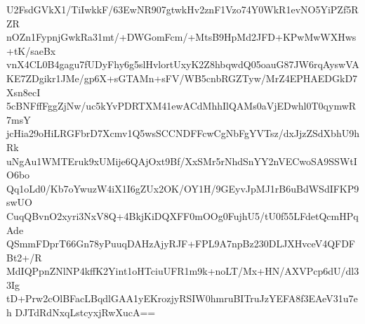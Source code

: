 U2FsdGVkX1/TiIwkkF/63EwNR907gtwkHv2znF1Vzo74Y0WkR1evNO5YiPZf5RZR
nOZn1FypnjGwkRa31mt/+DWGomFcm/+MtsB9HpMd2JFD+KPwMwWXHws+tK/saeBx
vnX4CL0B4gagu7fUDyFhy6g5slHvlortUxyK2Z8hbqwdQ05oauG87JW6rqAyswVA
KE7ZDgikr1JMe/gp6X+sGTAMn+sFV/WB5cnbRGZTyw/MrZ4EPHAEDGkD7Xsn8ecI
5cBNFffFggZjNw/uc5kYvPDRTXM41ewACdMhhIlQAMs0aVjEDwhl0T0qymwR7msY
jcHia29oHiLRGFbrD7Xcmv1Q5wsSCCNDFFcwCgNbFgYVTsz/dxJjzZSdXbhU9hRk
uNgAu1WMTEruk9xUMije6QAjOxt9Bf/XxSMr5rNhdSnYY2nVECwoSA9SSWtIO6bo
Qq1oLd0/Kb7oYwuzW4iX1I6gZUx2OK/OY1H/9GEyvJpMJ1rB6uBdWSdIFKP9swUO
CuqQBvnO2xyri3NxV8Q+4BkjKiDQXFF0mOOg0FujhU5/tU0f55LFdetQcmHPqAde
QSmmFDprT66Gn78yPuuqDAHzAjyRJF+FPL9A7npBz230DLJXHvceV4QFDFBt2+/R
MdIQPpnZNlNP4kffK2Yint1oHTciuUFR1m9k+noLT/Mx+HN/AXVPcp6dU/dl33Ig
tD+Prw2cOlBFacLBqdlGAA1yEKrozjyRSIW0hmruBITruJzYEFA8f3EAeV31u7eh
DJTdRdNxqLstcyxjRwXucA==
